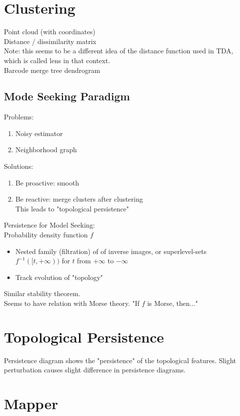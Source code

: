 \documentclass[10pt,a4paper]{report}
\begin{document}
\section{Clustering}
Point cloud (with coordinates)\\

Distance / dissimilarity matrix\\

Note: this seems to be a different idea of the distance function used in TDA, which is called lens in that context.\\

Barcode \textrightarrow merge tree \textrightarrow dendrogram

\subsection{Mode Seeking Paradigm}
Problems:
\begin{enumerate}
	\item Noisy estimator
	\item Neighborhood graph
\end{enumerate}
Solutions:
\begin{enumerate}
	\item Be proactive: smooth
	\item Be reactive: merge clusters after clustering\\
		  This leads to "topological persistence"
\end{enumerate}

Persistence for Model Seeking:\\
Probability density function $f$\\
\begin{itemize}
	\item Nested family (filtration) of of inverse images, or superlevel-sets $f^{-1}([t,+\infty))$ for 			  $t$ from $+\infty$ to $-\infty$
	\item Track evolution of "topology"
\end{itemize}
Similar stability theorem.\\
Seems to have relation with Morse theory. "If $f$ is Morse, then..."

\section{Topological Persistence}
Persistence diagram shows the "persistence" of the topological features.
Slight perturbation causes slight difference in persistence diagrams.


\section{Mapper}
\end{document}

